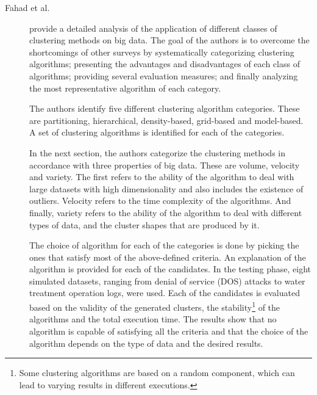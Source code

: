 \begin{description}
    \item[Fahad et al.]\cite{Fahad.Alshatri.ea_SurveyClusteringAlgorithms_2014a} provide a detailed analysis of the application of different classes of clustering methods on big data. The goal of the authors is to overcome the shortcomings of other surveys by systematically categorizing clustering algorithms; presenting the advantages and disadvantages of each class of algorithms; providing several evaluation measures; and finally analyzing the most representative algorithm of each category.
    
    The authors identify five different clustering algorithm categories. These are partitioning, hierarchical, density-based, grid-based and model-based. A set of clustering algorithms is identified for each of the categories.

    In the next section, the authors categorize the clustering methods in accordance with three properties of big data. These are volume, velocity and variety. The first refers to the ability of the algorithm to deal with large datasets with high dimensionality and also includes the existence of outliers. Velocity refers to the time complexity of the algorithms. And finally, variety refers to the ability of the algorithm to deal with different types of data, and the cluster shapes that are produced by it.

    The choice of algorithm for each of the categories is done by picking the ones that satisfy most of the above-defined criteria. An explanation of the algorithm is provided for each of the candidates. In the testing phase, eight simulated datasets, ranging from denial of service (DOS) attacks to water treatment operation logs, were used. Each of the candidates is evaluated based on the validity of the generated clusters, the stability\footnote{Some clustering algorithms are based on a random component, which can lead to varying results in different executions.} of the algorithms and the total execution time. The results show that no algorithm is capable of satisfying all the criteria and that the choice of the algorithm depends on the type of data and the desired results.
\end{description}

